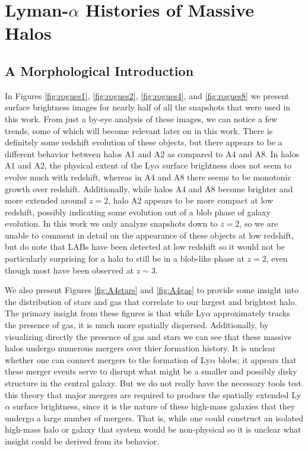 \chapter{Lyman-\texorpdfstring{$\alpha$}{a} Histories of Massive Halos}

\section{A Morphological Introduction}

In Figures \ref{fig:rogues1}, \ref{fig:rogues2}, \ref{fig:rogues4}, and \ref{fig:rogues8} we present surface brightness images for nearly half of all the snapshots that were used in this work.
From just a by-eye analysis of these images, we can notice a few trends, some of which will become relevant later on in this work.
There is definitely some redshift evolution of these objects, but there appears to be a different behavior between halos A1 and A2 as compared to A4 and A8.
In halos A1 and A2, the physical extent of the Ly$\alpha$ surface brightness does not seem to evolve much with redshift, whereas in A4 and A8 there seems to be monotonic growth over redshift.
Additionally, while halos A4 and A8 become brighter and more extended around $z=2$, halo A2 appears to be more compact at low redshift, possibly indicating some evolution out of a blob phase of galaxy evolution.
In this work we only analyze snapshots down to $z=2$, so we are unable to comment in detail on the appearance of these objects at low redshift, but do note that LABs have been detected at low redshift \citep{Barger2012,Prescott2013} so it would not be particularly surprising for a halo to still be in a blob-like phase at $z=2$, even though most have been observed at $z\sim3$.

We also present Figures \ref{fig:A4stars} and \ref{fig:A4gas} to provide some insight into the distribution of stars and gas that correlate to our largest and brightest halo.
The primary insight from these figures is that while Ly$\alpha$ approximately tracks the presence of gas, it is much more spatially dispersed.
Additionally, by visualizing directly the presence of gas and stars we can see that these massive halos undergo numerous mergers over thier formation history.
It is unclear whether one can connect mergers to the formation of Ly$\alpha$ blobs; it appears that these merger events serve to disrupt what might be a smaller and possibly disky structure in the central galaxy.
But we do not really have the necessary tools test this theory that major mergers are required to produce the spatially extended Ly$\alpha$ surface brightness, since it is the nature of these high-mass galaxies that they undergo a large number of mergers.
That is, while one could construct an isolated high-mass halo or galaxy that system would be non-physical so it is unclear what insight could be derived from its behavior.

